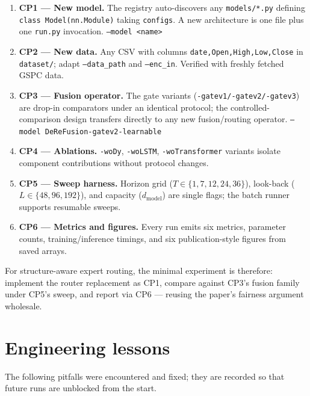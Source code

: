 \documentclass[preprint,12pt]{elsarticle}
\begin{document}
\begin{enumerate}
  \item \textbf{CP1 --- New model.} The registry auto-discovers any
        \texttt{models/*.py} defining \texttt{class Model(nn.Module)} taking
        \texttt{configs}. A new architecture is one file plus one
        \texttt{run.py} invocation.
        \texttt{--model <name>}
  \item \textbf{CP2 --- New data.} Any CSV with columns
        \texttt{date,Open,High,Low,Close} in \texttt{dataset/};
        adapt \texttt{--data\_path} and \texttt{--enc\_in}. Verified with
        freshly fetched GSPC data.
  \item \textbf{CP3 --- Fusion operator.} The gate variants
        (\texttt{-gatev1/-gatev2/-gatev3}) are drop-in comparators under an
        identical protocol; the controlled-comparison design transfers
        directly to any new fusion/routing operator.
        \texttt{--model DeReFusion-gatev2-learnable}
  \item \textbf{CP4 --- Ablations.} \texttt{-woDy}, \texttt{-woLSTM},
        \texttt{-woTransformer} variants isolate component contributions
        without protocol changes.
  \item \textbf{CP5 --- Sweep harness.} Horizon grid ($T\in\{1,7,12,24,36\}$),
        look-back ($L\in\{48,96,192\}$), and capacity ($d_{\mathrm{model}}$)
        are single flags; the batch runner supports resumable sweeps.
  \item \textbf{CP6 --- Metrics and figures.} Every run emits six metrics,
        parameter counts, training/inference timings, and six
        publication-style figures from saved arrays.
\end{enumerate}

For structure-aware expert routing, the minimal experiment is therefore:
implement the router replacement as CP1, compare against CP3's fusion
family under CP5's sweep, and report via CP6 --- reusing the paper's
fairness argument wholesale.

\section{Engineering lessons}
\label{sec:lessons}

The following pitfalls were encountered and fixed; they are recorded so
that future runs are unblocked from the start.
\end{document}
